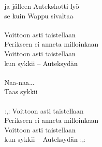             ja jälleen Autekshotti lyö \\
            se kuin Wappu sivaltaa \\
\hspace{10mm} \\
            Voittoon asti taistellaan \\
            Perikseen ei anneta milloinkaan \\
            Voittoon asti taistellaan \\
            kun sykkii – Auteksydän \\
\hspace{10mm} \\
            Naa-naa... \\
            Taas sykkii \\
\hspace{10mm} \\
            :,: Voittoon asti taistellaan \\
            Perikseen ei anneta milloinkaan \\
            Voittoon asti taistellaan \\
            kun sykkii – Auteksydän :,: \\
